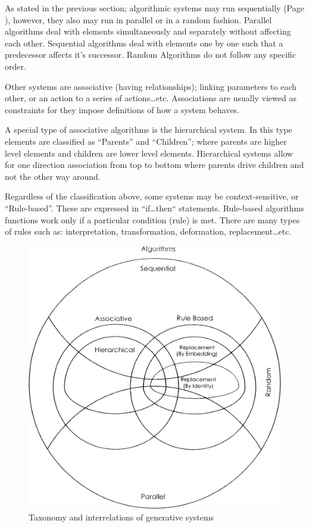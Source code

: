 As stated in the previous section; algorithmic systems may run sequentially (Page \pageref{SequentialAlgorithms}), however, they also may run in parallel or in a random fashion. Parallel algorithms deal with elements simultaneously and separately without affecting each other. Sequential algorithms deal with elements one by one such that a predecessor affects it's successor. Random Algorithms do not follow any specific order. \cite{khaldi04}

Other systems are associative (having relationships); linking parameters to each other, or an action to a series of actions\ldots etc. Associations are usually viewed as constraints for they impose definitions of how a system behaves. \cite{khaldi04}

A special type of associative algorithms is the hierarchical system. In this type elements are classified as ``Parents'' and ``Children''; where parents are higher level elements and children are lower level elements. Hierarchical systems allow for one direction association from top to bottom where parents drive children and not the other way around. \cite{khaldi04}

Regardless of the classification above, some systems may be context-sensitive, or ``Rule-based''. These are expressed in ``if\ldots then`` statements. Rule-based algorithms functions work only if a particular condition (rule) is met. There are many types of rules such as: interpretation, transformation, deformation, replacement\ldots etc. \cite{khaldi04}

\begin{figure}[htbp]
	\centering
	\includegraphics[width=\textwidth]{./Images/1-Taxonomy}
	\caption[Taxonomy of Generative Systems]{Taxonomy and interrelations of generative systems \cite{khaldi04}}
	\label{fig:Taxonomy}
\end{figure}

